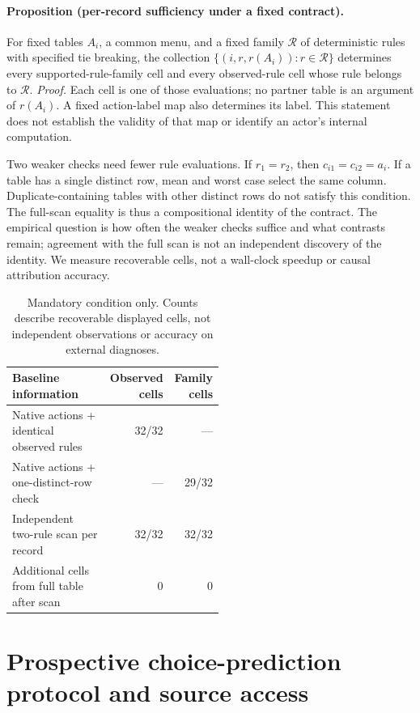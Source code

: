 \paragraph{Proposition (per-record sufficiency under a fixed contract).}
For fixed tables $A_i$, a common menu, and a fixed family $\mathcal R$ of
deterministic rules with specified tie breaking, the collection
$\{(i,r,r(A_i)):r\in\mathcal R\}$ determines every supported-rule-family
cell and every observed-rule cell whose rule belongs to $\mathcal R$.
\emph{Proof.} Each cell is one of those evaluations; no partner table is an
argument of $r(A_i)$. A fixed action-label map also determines its label.
This statement does not establish the validity of that map or identify
an actor's internal computation.

Two weaker checks need fewer rule evaluations. If $r_1=r_2$, then
$c_{i1}=c_{i2}=a_i$. If a table has a single distinct row, mean and worst case
select the same column. Duplicate-containing tables with other distinct
rows do not satisfy this condition. The full-scan equality is thus a
compositional identity of the contract. The
empirical question is how often the weaker checks suffice and what contrasts
remain; agreement with the full scan is not an independent discovery of the
identity. We measure recoverable cells, not a wall-clock speedup or causal
attribution accuracy.


\begin{table}[h]
\centering\small
\begin{tabular}{p{0.52\linewidth}rr}
\toprule
Baseline information & Observed cells & Family cells\\
\midrule
Native actions + identical observed rules & 32/32 & ---\\
Native actions + one-distinct-row check & --- & 29/32\\
Independent two-rule scan per record & 32/32 & 32/32\\
Additional cells from full table after scan & 0 & 0\\
\bottomrule
\end{tabular}
\caption{Mandatory condition only. Counts describe recoverable displayed
cells, not independent observations or accuracy on external diagnoses.}
\end{table}


\section{Prospective choice-prediction protocol and source access}
\label{app:prospective}

